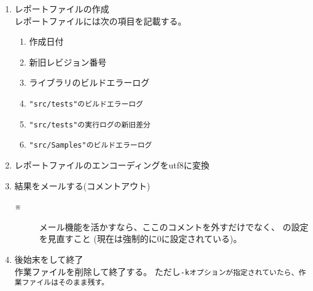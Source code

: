 \begin{Process}
\begin{enumerate}
  \item	レポートファイルの作成\\
	レポートファイルには次の項目を記載する。
	\begin{narrow}[\WID]
		\begin{enumerate}
		  \item	作成日付
		  \item	新旧レビジョン番号
		  \item	ライブラリのビルドエラーログ
		  \item	\tt{"src/tests"}のビルドエラーログ
		  \item	\tt{"src/tests"}の実行ログの新旧差分
		  \item	\tt{"src/Samples"}のビルドエラーログ
		\end{enumerate}
	\end{narrow}
	\medskip

  \item	レポートファイルのエンコーディングをutf8に変換
	\medskip

  \item	結果をメールする(コメントアウト)
	\begin{description}
	  \item[※] メール機能を活かすなら、ここのコメントを外すだけでなく、
		    の設定を見直すこと
		    (現在は強制的に0に設定されている)。
	\end{description}
	\medskip

  \item	後始末をして終了\\
	作業ファイルを削除して終了する。
	ただし\tt{-k}オプションが指定されていたら、作業ファイルはそのまま残す。
	\medskip

\end{enumerate}
\end{Process}
